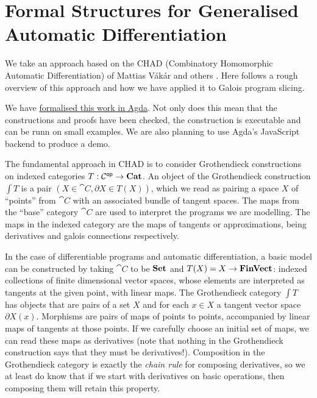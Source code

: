 \section{Formal Structures for Generalised Automatic Differentiation}


We take an approach based on the CHAD (Combinatory Homomorphic Automatic Differentiation) of Mattias Vákár and others \cite{nunes2023}. Here follows a rough overview of this approach and how we have applied it to Galois program slicing. 

We have \href{https://github.com/bobatkey/approx-diff}{formalised this work in Agda}. Not only does this mean that the constructions and proofs have been checked, the construction is executable and can be runn on small examples. We are also planning to use Agda's JavaScript backend to produce a demo.

The fundamental approach in CHAD is to consider Grothendieck constructions on indexed categories $T : \mathcal{C}^{\mathsf{op}} \to \mathbf{Cat}$. An object of the Grothendieck construction $\int T$ is a pair $(X \in \cat{C}, \partial X \in T(X))$, which we read as pairing a space $X$ of ``points'' from $\cat{C}$ with an associated bundle of tangent spaces. The maps from the ``base'' category $\cat{C}$ are used to interpret the programs we are modelling. The maps in the indexed category are the maps of tangents or approximations, being derivatives and galois connections respectively.

In the case of differentiable programs and automatic differentiation, a basic model can be constructed by taking $\cat{C}$ to be $\mathbf{Set}$ and $T(X) = X \to \mathbf{FinVect}$: indexed collections of finite dimensional vector spaces, whose elements are interpreted as tangents at the given point, with linear maps. The Grothendieck category $\int T$ has objects that are pairs of a set $X$ and for each $x \in X$ a tangent vector space $\partial X(x)$. Morphisms are pairs of maps of points to points, accompanied by linear maps of tangents at those points. If we carefully choose an initial set of maps, we can read these maps as derivatives (note that nothing in the Grothendieck construction says that they must be derivatives!). Composition in the Grothendieck category is exactly the {\em chain rule} for composing derivatives, so we at least do know that if we start with derivatives on basic operations, then composing them will retain this property.

